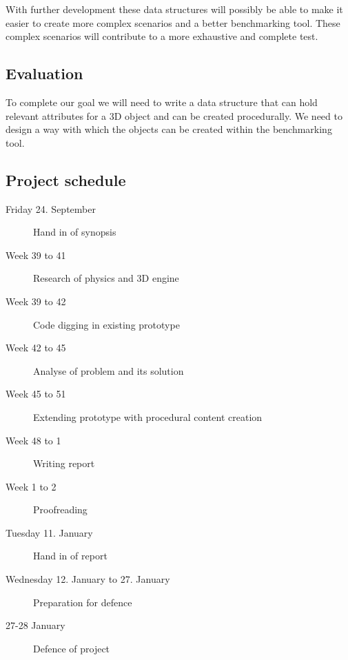 \documentclass[a4paper, 10pt]{article}
\begin{document}
With further development these data structures will possibly be able to make it easier to create more complex scenarios
and a better benchmarking tool. These complex scenarios will contribute to a more exhaustive and complete test.
\subsection*{Evaluation}
To complete our goal we will need to write a data structure that can hold relevant attributes for a 3D object and can be
created procedurally. We need to design a way with which the objects can be created within the benchmarking tool.
\subsection*{Project schedule}
\begin{description}
\item[Friday 24. September] Hand in of synopsis
\item[Week 39 to 41]Research of physics and 3D engine
\item[Week 39 to 42]Code digging in existing prototype
\item[Week 42 to 45]Analyse of problem and its solution
\item[Week 45 to 51]Extending prototype with procedural content creation
\item[Week 48 to 1]Writing report
\item[Week 1 to 2] Proofreading
\item[Tuesday 11. January] Hand in of report
\item[Wednesday 12. January to 27. January] Preparation for defence
\item[27-28 January] Defence of project
\end{description}
\end{document}

